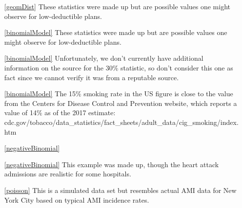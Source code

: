 \begin{itemize}
\item[\ref{geomDist}]
    These statistics were made up but are possible
    values one might observe for low-deductible plans.

\item[\ref{binomialModel}]
    These statistics were made up but are possible
    values one might observe for low-deductible plans.
\item[\ref{binomialModel}]
    Unfortunately, we don't currently have additional
    information on the source for the 30\% statistic,
    so don't consider this one as fact since we cannot
    verify it was from a reputable source.    
\item[\ref{binomialModel}]
    The 15\% smoking rate in the US figure is close to
    the value from the Centers for Disease Control and
    Prevention website, which reports a value of 14\%
    as of the 2017 estimate: \\
        {cdc.gov/tobacco/data\_statistics/fact\_sheets/adult\_data/cig\_smoking/index.htm}

\item[\ref{negativeBinomial}]
    \madeup{}
\item[\ref{negativeBinomial}]
    This example was made up, though the heart attack
    admissions are realistic for some hospitals.

\item[\ref{poisson}]
    This is a simulated data set but resembles actual
    AMI data for New York City based on typical AMI
    incidence rates.
\end{itemize}








\section{}
\label{ch_foundations_for_inf_data}

